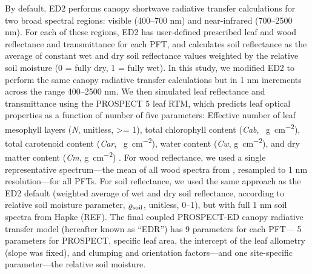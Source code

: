 By default, ED2 performs canopy shortwave radiative transfer calculations for two broad spectral regions: visible (400--700 \unit{nm}) and near-infrared (700--2500 \unit{nm}).
For each of these regions, ED2 has user-defined prescribed leaf and wood reflectance and transmittance for each PFT, and calculates soil reflectance as the average of constant wet and dry soil reflectance values weighted by the relative soil moisture (0 = fully dry, 1 = fully wet).
In this study, we modified ED2 to perform the same canopy radiative transfer calculations but in 1 \unit{nm} increments across the range 400--2500 \unit{nm}.
We then simulated leaf reflectance and transmittance using the PROSPECT 5 leaf RTM,
which predicts leaf optical properties as a function of number of five parameters:
Effective number of leaf mesophyll layers (\emph{N}, unitless, >= 1),
total chlorophyll content (\emph{Cab}, \unit{\mu g ~ cm^{-2}}),
total carotenoid content (\emph{Car}, \unit{\mu g ~ cm^{-2}}),
water content (\emph{Cw}, \unit{g ~ cm^{-2}}),
and dry matter content (\emph{Cm}, \unit{g ~ cm^{-2}})
\citep{feret2008prospect4}.
For wood reflectance, we used a single representative spectrum---the mean of all wood spectra from \citet{asner_1998_biophysical}, resampled to 1 \unit{nm} resolution---for all PFTs.
For soil reflectance, we used the same approach as the ED2 default (weighted average of wet and dry soil reflectance, according to relative soil moisture parameter, $\varrho_{\mathrm{soil}}$, unitless, 0--1), but with full 1 \unit{nm} soil spectra from Hapke (REF). %
The final coupled PROSPECT-ED canopy radiative transfer model (hereafter known as ``EDR'') has 9 parameters for each PFT---
5 parameters for PROSPECT, specific leaf area, the intercept of the leaf allometry (slope was fixed), and clumping and orientation factors---and one site-specific parameter---the relative soil moisture.


